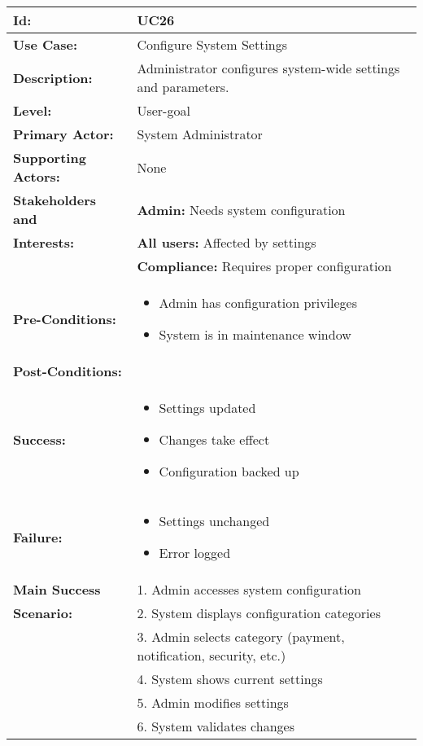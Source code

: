 \documentclass[12pt]{article}
\begin{document}
\begin{longtable}{|p{3cm}|p{11cm}|}
\hline
\textbf{Id:} & UC26 \\
\hline
\textbf{Use Case:} & Configure System Settings \\
\hline
\textbf{Description:} & Administrator configures system-wide settings and parameters. \\
\hline
\textbf{Level:} & User-goal \\
\hline
\textbf{Primary Actor:} & System Administrator \\
\hline
\textbf{Supporting Actors:} & None \\
\hline
\textbf{Stakeholders and} & \textbf{Admin:} Needs system configuration \\
\textbf{Interests:} & \textbf{All users:} Affected by settings \\
& \textbf{Compliance:} Requires proper configuration \\
\hline
\textbf{Pre-Conditions:} & 
\begin{itemize}
    \item Admin has configuration privileges
    \item System is in maintenance window
\end{itemize} \\
\hline
\textbf{Post-Conditions:} & \\
\textbf{Success:} & 
\begin{itemize}
    \item Settings updated
    \item Changes take effect
    \item Configuration backed up
\end{itemize} \\
\textbf{Failure:} & 
\begin{itemize}
    \item Settings unchanged
    \item Error logged
\end{itemize} \\
\hline
\textbf{Main Success} & 1. Admin accesses system configuration \\
\textbf{Scenario:} & 2. System displays configuration categories \\
& 3. Admin selects category (payment, notification, security, etc.) \\
& 4. System shows current settings \\
& 5. Admin modifies settings \\
& 6. System validates changes \\

\end{longtable}
\end{document}
